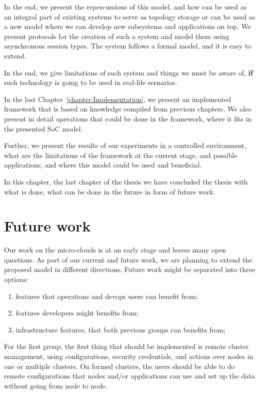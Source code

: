 In the end, we present the repercussions of this model, and how can be used as an integral part of existing systems to serve as topology storage or can be used as a new model where we can develop new subsystems and applications on top. We present protocols for the creation of such a system and model them using asynchronous session types. The system follows a formal model, and it is easy to extend.

In the end, we give limitations of such system and things we must be aware of, \textbf{if} such technology is going to be used in real-life scenarios.

In the last Chapter~\ref{chapter:Implementation}, we present an implemented framework that is based on knowledge compiled from previous chapters. We also present in detail operations that could be done in the framework, where it fits in the presented SoC model.

Further, we present the results of our experiments in a controlled environment, what are the limitations of the framework at the current stage, and possible applications, and where this model could be used and beneficial.

In this chapter, the last chapter of the thesis we have concluded the thesis with what is done, what can be done in the future in form of future work.
%
%
\section{Future work}\label{sec:future_work}
%
Our work on the micro-clouds is at an early stage and leaves many open questions. As part of our current and future work, we are planning to extend the proposed model in different directions. Future work might be separated into three options:
 
\begin{enumerate}[start=1,label={(\bfseries \arabic*)}]
	\item features that operations and devops users can benefit from;
	\item features developers might benefits from;
	\item infrastructure features, that both previous groups can benefits from;
\end{enumerate}

\noindent
For the first group, the first thing that should be implemented is remote cluster management, using configurations, security credentials, and actions over nodes in one or multiple clusters. On formed clusters, the users should be able to do remote configurations that nodes and/or applications can use and set up the data without going from node to node.


